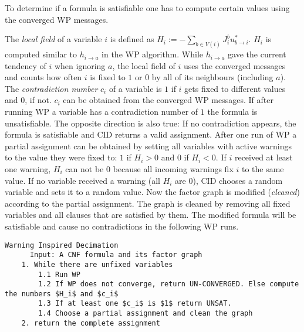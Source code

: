 To determine if a formula is satisfiable one has to compute certain values using the converged WP messages.

The \emph{local field} of a variable $i$ is defined as $H_i := - \sum_{b \in V(i)} J_i^b u^\ast_{b\rightarrow i}$. \newline $H_i$ is computed similar to $h_{i \rightarrow a}$ in the WP algorithm. While 
$h_{i \rightarrow a}$ gave the current tendency of $i$ when ignoring $a$, the local field of $i$ uses the converged messages and counts how often $i$ is fixed to $1$ or $0$ by all of its neighbours (including $a$). \newline
The \emph{contradiction number} $c_i$ of a variable is $1$ if $i$ gets fixed to different values and $0$, if not. $c_i$ can be obtained from the converged WP messages. If after running WP a variable has a contradiction number of $1$ the formula is unsatisfiable. \newline
The opposite direction is also true: If no contradiction appears, the formula is satisfiable and CID returns a valid assignment. 
After one run of WP a partial assignment can be obtained by setting all variables with active warnings to the value they were fixed to: $1$ if $H_i > 0$ and $0$ if $H_i < 0$. If $i$ received at least one warning, $H_i$ can not be $0$ because all incoming warnings fix $i$ to the same value. If no variable received a warning (all $H_i$ are $0$), CID chooses a random variable and sets it to a random value. \newline
Now the factor graph is modified (\emph{cleaned}) according to the partial assignment. The graph is cleaned by removing all fixed variables and all clauses that are satisfied by them.  The modified formula will be satisfiable and cause no contradictions in the following WP runs.
\newpage

\begin{lstlisting}[mathescape=true, frame = single]
	Warning Inspired Decimation
	  Input: A CNF formula and its factor graph 
	1. While there are unfixed variables
		1.1 Run WP
		1.2 If WP does not converge, return UN-CONVERGED. Else compute the numbers $H_i$ and $c_i$
		1.3 If at least one $c_i$ is $1$ return UNSAT.
		1.4 Choose a partial assignment and clean the graph
	2. return the complete assignment
\end{lstlisting}


